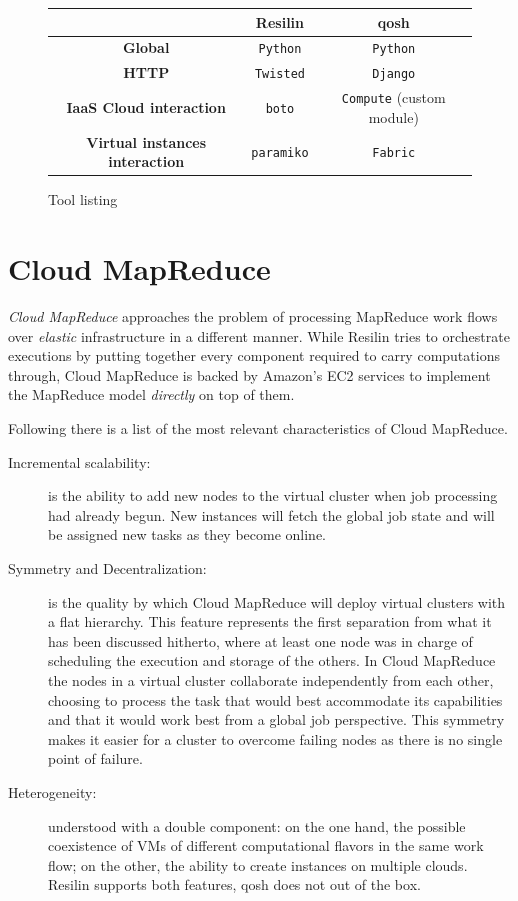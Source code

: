 \begin{figure}[tbp]
\begin{center}
\begin{tabular}{|c|c|c|}
\hline
& \textbf{Resilin} & \textbf{qosh} \\
\hline
\textbf{Global} & \texttt{Python} & \texttt{Python} \\
\hline
\textbf{HTTP} & \texttt{Twisted} & \texttt{Django} \\
\hline
\textbf{IaaS Cloud interaction} & \texttt{boto} & \texttt{Compute} (custom module) \\
\hline
\textbf{Virtual instances interaction} & \texttt{paramiko} & \texttt{Fabric} \\
\hline
\end{tabular}
\caption{Tool listing}
\label{fig:resilinproyecto}
\end{center}
\end{figure}

\section{Cloud MapReduce}\label{sec:cloudmapred}
\noindent \emph{Cloud MapReduce} approaches the problem of processing MapReduce work flows over \emph{elastic} infrastructure in a different manner. While Resilin tries to orchestrate executions by putting together every component required to carry computations through, Cloud MapReduce is backed by Amazon's EC2 services to implement the MapReduce model \cite{googlemapreduce} \emph{directly} on top of them.

Following there is a list of the most relevant characteristics of Cloud MapReduce.

\begin{description}
    \item[Incremental scalability:] is the ability to add new nodes to the virtual cluster when job processing had already begun. New instances will fetch the global job state and will be assigned new tasks as they become online.
    \item[Symmetry and Decentralization:] is the quality by which Cloud MapReduce will deploy virtual clusters with a flat hierarchy. This feature represents the first separation from what it has been discussed hitherto, where at least one node was in charge of scheduling the execution and storage of the others. In Cloud MapReduce the nodes in a virtual cluster collaborate independently from each other, choosing to process the task that would best accommodate its capabilities and that it would work best from a global job perspective. This symmetry makes it easier for a cluster to overcome failing nodes as there is no single point of failure.
    \item[Heterogeneity:] understood with a double component: on the one hand, the possible coexistence of VMs of different computational flavors in the same work flow; on the other, the ability to create instances on multiple clouds. Resilin supports both features, qosh does not out of the box.
\end{description}

